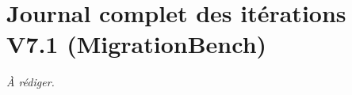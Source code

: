 \chapter{Journal complet des it\'erations V7.1 (MigrationBench)}\label{annexe:journal-v71}


\textit{\`A r\'ediger.}
